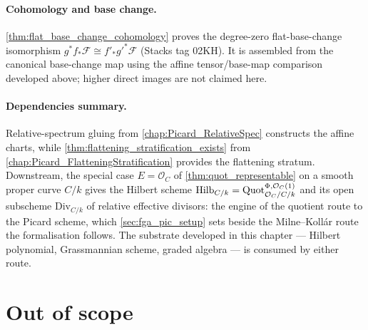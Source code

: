 \paragraph{Cohomology and base change.}
\cref{thm:flat_base_change_cohomology} proves the degree-zero flat-base-change
isomorphism \(g^*f_*\mathcal F\cong f'_*g'^*\mathcal F\) (Stacks tag 02KH).
It is assembled from the canonical base-change map using the affine
tensor/base-map comparison developed above; higher direct images are not
claimed here.

\paragraph{Dependencies summary.}
Relative-spectrum gluing from \cref{chap:Picard_RelativeSpec} constructs
the affine charts, while
\cref{thm:flattening_stratification_exists} from
\cref{chap:Picard_FlatteningStratification} provides the flattening stratum.
Downstream, the special case \(E = \mathcal{O}_C\) of
\cref{thm:quot_representable} on a smooth proper curve \(C/k\) gives the Hilbert
scheme \(\operatorname{Hilb}_{C/k} = \operatorname{Quot}^{\Phi,\mathcal{O}_C(1)}_{\mathcal{O}_C/C/k}\)
and its open subscheme \(\mathrm{Div}_{C/k}\) of relative effective divisors:
the engine of the quotient route to the Picard scheme, which
\cref{sec:fga_pic_setup} sets beside the Milne--Koll\'ar route the formalisation
follows.  The substrate developed in this chapter --- Hilbert polynomial,
Grassmannian scheme, graded algebra --- is consumed by either route.

\section{Out of scope}
\label{sec:quot_out_of_scope}


